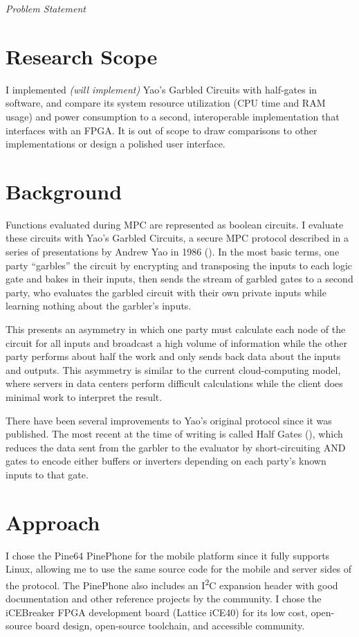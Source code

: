 \documentclass[letterpaper]{article}
\newcommand{\comment}[1]{{\color{red}\textit{#1}}}
\newcommand{\ISquaredC}{I\textsuperscript{2}C}
\begin{document}
\comment{Problem Statement}

\section{Research Scope}
I implemented \comment{(will implement)} Yao's Garbled Circuits with half-gates in software, and compare its system resource utilization (CPU time and RAM usage) and power consumption to a second, interoperable implementation that interfaces with an FPGA\@. It is out of scope to draw comparisons to other implementations or design a polished user interface.

\section{Background}
Functions evaluated during MPC are represented as boolean circuits. I evaluate these circuits with Yao's Garbled Circuits, a secure MPC protocol described in a series of presentations by Andrew Yao in 1986 (\cite{YaoGC}). In the most basic terms, one party ``garbles'' the circuit by encrypting and transposing the inputs to each logic gate and bakes in their inputs, then sends the stream of garbled gates to a second party, who evaluates the garbled circuit with their own private inputs while learning nothing about the garbler's inputs.

This presents an asymmetry in which one party must calculate each node of the circuit for all inputs and broadcast a high volume of information while the other party performs about half the work and only sends back data about the inputs and outputs. This asymmetry is similar to the current cloud-computing model, where servers in data centers perform difficult calculations while the client does minimal work to interpret the result.

There have been several improvements to Yao's original protocol since it was published. The most recent at the time of writing is called Half Gates (\cite{HalfGates}), which reduces the data sent from the garbler to the evaluator by short-circuiting AND gates to encode either buffers or inverters depending on each party's known inputs to that gate.

\section{Approach}
I chose the Pine64 PinePhone for the mobile platform since it fully supports Linux, allowing me to use the same source code for the mobile and server sides of the protocol. The PinePhone also includes an \ISquaredC{} expansion header with good documentation and other reference projects by the community. I chose the iCEBreaker FPGA development board (Lattice iCE40) for its low cost, open-source board design, open-source toolchain, and accessible community.
\end{document}
